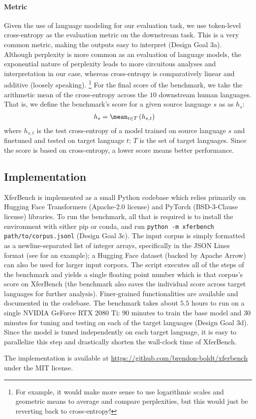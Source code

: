 \paragraph{Metric}

Given the use of language modeling for our evaluation task, we use token-level cross-entropy as the evaluation metric on the downstream task.
This is a very common metric, making the outputs easy to interpret (Design Goal 3a).
Although perplexity is more common as an evaluation of language models, the exponential nature of perplexity leads to more circuitous analyses and interpretation in our case, whereas cross-entropy is comparatively linear and additive (loosely speaking).
\unskip\footnote{For example, it would make more sense to use logarithmic scales and geometric means to average and compare perplexities, but this would just be reverting back to cross-entropy!}
For the final score of the benchmark, we take the arithmetic mean of the cross-entropy across the $10$ downstream human languages.
That is, we define the benchmark's score for a given source language $s$ as as $h_s$:
\begin{align}
  h_{s} &= \mean_{t \in T}\left( h_{s,t}\right)
  \label{eq:hs}
\end{align}
where $h_{s,t}$ is the test cross-entropy of a model trained on source language $s$ and finetuned and tested on target language $t$;
  $T$ is the set of target languages.
Since the score is based on cross-entropy, a lower score means better performance.


\subsection{Implementation}
\unskip\label{sec:implementation}

XferBench is implemented as a small Python codebase which relies primarily on Hugging Face Transformers \citep{Wolf2019HuggingFacesTS} (Apache-2.0 license) and PyTorch \citep{pytorch} (BSD-3-Clause license) libraries.
To run the benchmark, all that is required is to install the environment with either pip or conda, and run {\small\texttt{python -m xferbench path/to/corpus.jsonl}} (Design Goal 3c).
The input corpus is simply formatted as a newline-separated list of integer arrays, specifically in the JSON Lines format (see  for an example); a Hugging Face dataset (backed by Apache Arrow) can also be used for larger input corpora.
The script executes all of the steps of the benchmark and yields a single floating point number which is that corpus's score on XferBench (the benchmark also saves the individual score across target languages for further analysis).
Finer-grained functionalities are available and documented in the codebase.
The benchmark takes about $5.5$ hours to run on a single NVIDIA GeForce RTX 2080 Ti:
  $90$ minutes to train the base model and $30$ minutes for tuning and testing on each of the target languages (Design Goal 3d).
Since the model is tuned independently on each target language, it is easy to parallelize this step and drastically shorten the wall-clock time of XferBench.

The implementation is available at \url{https://github.com/brendon-boldt/xferbench} under the MIT license.

